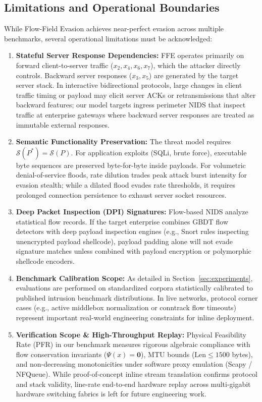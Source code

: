 \documentclass[pdflatex,sn-mathphys-num]{sn-jnl}
\theoremstyle{thmstyleone}
\theoremstyle{thmstyletwo}
\theoremstyle{thmstylethree}
\begin{document}
\subsection{Limitations and Operational Boundaries}
While Flow-Field Evasion achieves near-perfect evasion across multiple benchmarks, several operational limitations must be acknowledged:
\begin{enumerate}
    \item \textbf{Stateful Server Response Dependencies:} FFE operates primarily on forward client-to-server traffic ($x_2, x_4, x_6, x_7$), which the attacker directly controls. Backward server responses ($x_3, x_5$) are generated by the target server stack. In interactive bidirectional protocols, large changes in client traffic timing or payload may elicit server ACKs or retransmissions that alter backward features; our model targets ingress perimeter NIDS that inspect traffic at enterprise gateways where backward server responses are treated as immutable external responses.
    \item \textbf{Semantic Functionality Preservation:} The threat model requires $\mathcal{S}(P^*) = \mathcal{S}(P)$. For application exploits (SQLi, brute force), executable byte sequences are preserved byte-for-byte inside payloads. For volumetric denial-of-service floods, rate dilution trades peak attack burst intensity for evasion stealth; while a dilated flood evades rate thresholds, it requires prolonged connection persistence to exhaust server socket resources.
    \item \textbf{Deep Packet Inspection (DPI) Signatures:} Flow-based NIDS analyze statistical flow records. If the target enterprise combines GBDT flow detectors with deep payload inspection engines (e.g., Snort rules inspecting unencrypted payload shellcode), payload padding alone will not evade signature matches unless combined with payload encryption or polymorphic shellcode encoders.
    \item \textbf{Benchmark Calibration Scope:} As detailed in Section~\ref{sec:experiments}, evaluations are performed on standardized corpora statistically calibrated to published intrusion benchmark distributions. In live networks, protocol corner cases (e.g., active middlebox normalization or conntrack flow timeouts) represent important real-world engineering constraints for inline deployment.
    \item \textbf{Verification Scope \& High-Throughput Replay:} Physical Feasibility Rate (PFR) in our benchmark measures rigorous algebraic compliance with flow conservation invariants ($\Psi(x) = \mathbf{0}$), MTU bounds ($\text{Len} \le 1500$ bytes), and non-decreasing monotonicities under software proxy emulation (Scapy / NFQueue). While proof-of-concept inline stream translation confirms protocol and stack validity, line-rate end-to-end hardware replay across multi-gigabit hardware switching fabrics is left for future engineering work.
\end{enumerate}
\end{document}
